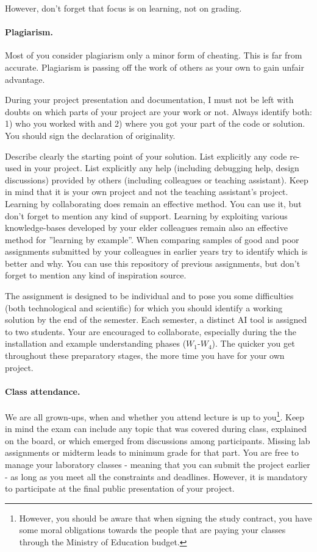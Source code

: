However, don't forget that focus is on learning, not on grading.

\paragraph{Plagiarism.} Most of you consider plagiarism only a minor form of cheating.
This is far from accurate. Plagiarism is passing off the work of others as your own to gain unfair advantage. 

During your project presentation and documentation, 
I must not be left with doubts on which parts of your project are your work or not.  
Always identify both: 
1) who you worked with and 
2) where you got your part of the code or solution.
You should sign the declaration of originality. 

Describe clearly the starting point of your solution.
List explicitly any code re-used in your project. 
List explicitly any help (including debugging help, design discussions) provided by others (including colleagues or teaching assistant). 
Keep in mind that it is your own project and not the teaching assistant's project. 
Learning by collaborating does remain an effective method. 
You can use it, but don't forget to mention any kind of support. 
Learning by exploiting various knowledge-bases developed by your elder colleagues remain also an effective method for ''learning by example''. 
When comparing samples of good and poor assignments submitted by your colleagues in earlier years try to identify which is better and why. 
You can use this repository of previous assignments, but don't forget to mention any kind of inspiration source. 

The assignment is designed to be individual and to pose you some difficulties 
(both technological and scientific) for which you should identify a working solution by the end of the semester.  
Each semester, a distinct AI tool is assigned to two students. 
Your are encouraged to collaborate, especially during the the installation and example understanding phases ($W_1$-$W_4$). The quicker you get throughout these preparatory stages, the more time you have for your own project.


\paragraph{Class attendance.} 
We are all grown-ups, when and whether you attend lecture is up to you\footnote{However, you should be aware that when signing the study contract, you have some moral obligations towards the people that are paying your classes through the Ministry of Education budget.}. 
Keep in mind the exam can include any topic that was covered during class, explained on the board, 
or which emerged from discussions among participants. 
Missing lab assignments or midterm leads to minimum grade for that part.
You are free to manage your laboratory classes - meaning that you can submit the project earlier -  as long as you meet all the constraints and deadlines.
However, it is mandatory to participate at the final public presentation of your project. 
